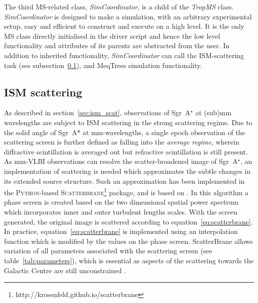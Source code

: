 The third MS-related class, \emph{SimCoordinator}, is a child of the {\it TropMS} class. {\it SimCoordinator} is designed to make a simulation, with an arbitrary experimental setup, easy and efficient to construct and execute on a high level. It is the only MS class directly initialised in the driver script and hence the low level functionality and attributes of its parents are abstracted from the user. In addition to inherited functionality, {\it SimCoordinator} can call the ISM-scattering task (see subsection~\ref{sec:ism_imp}), and {\sc MeqTrees} simulation functionality.
 

\subsection{ISM scattering}\label{sec:ism_imp}

As described in section~\ref{sec:ism_scat}, observations of Sgr~A$^\star$ at (sub)mm wavelengths are subject to ISM scattering in the strong scattering regime. Due to the solid angle of Sgr~A* at mm-wavelengths, a single epoch observation of the scattering screen is further defined as falling into the \emph{average regime}, wherein diffractive scintillation is averaged out but refractive scintillation is still present. As mm-VLBI observations can resolve the scatter-broadened image of Sgr~A$^\star$, an implementation of scattering is needed which approximates the subtle changes in its extended source structure. Such an approximation has been implemented in the \textsc{Python}-based \textsc{Scatterbrane}\footnote{http://krosenfeld.github.io/scatterbrane} package, and is based on \citet*{Johnson_2015a}. In this algorithm a phase screen is created based on the two dimensional spatial power spectrum  \citep*[see][Appendix C]{Johnson_2015a} which incorporates inner and outer turbulent lengths scales. With the screen generated, the original image is scattered according to equation~\ref{eq:scatterbrane}. In practice, equation~\ref{eq:scatterbrane} is implemented using an interpolation function which is modified by the values on the phase screen. {\sc ScatterBrane} allows variation of all parameters  associated with the scattering screen (see table~\ref{tab:parameters}), which is essential as aspects of the scattering towards the Galactic Centre are still unconstrained \citep[e.g.][]{Gwinn_2014}.





